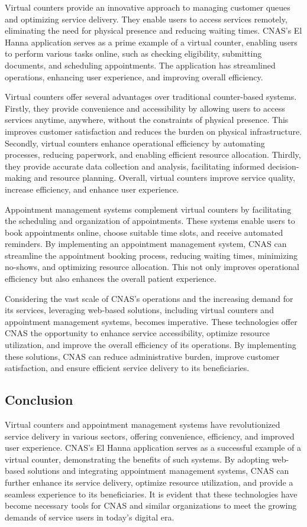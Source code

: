 Virtual counters provide an innovative approach to managing customer queues and optimizing service delivery. They enable users to access services remotely, eliminating the need for physical presence and reducing waiting times. CNAS's El Hanna application serves as a prime example of a virtual counter, enabling users to perform various tasks online, such as checking eligibility, submitting documents, and scheduling appointments. The application has streamlined operations, enhancing user experience, and improving overall efficiency.

Virtual counters offer several advantages over traditional counter-based systems. Firstly, they provide convenience and accessibility by allowing users to access services anytime, anywhere, without the constraints of physical presence. This improves customer satisfaction and reduces the burden on physical infrastructure. Secondly, virtual counters enhance operational efficiency by automating processes, reducing paperwork, and enabling efficient resource allocation. Thirdly, they provide accurate data collection and analysis, facilitating informed decision-making and resource planning. Overall, virtual counters improve service quality, increase efficiency, and enhance user experience.

Appointment management systems complement virtual counters by facilitating the scheduling and organization of appointments. These systems enable users to book appointments online, choose suitable time slots, and receive automated reminders. By implementing an appointment management system, CNAS can streamline the appointment booking process, reducing waiting times, minimizing no-shows, and optimizing resource allocation. This not only improves operational efficiency but also enhances the overall patient experience.


Considering the vast scale of CNAS's operations and the increasing demand for its services, leveraging web-based solutions, including virtual counters and appointment management systems, becomes imperative. These technologies offer CNAS the opportunity to enhance service accessibility, optimize resource utilization, and improve the overall efficiency of its operations. By implementing these solutions, CNAS can reduce administrative burden, improve customer satisfaction, and ensure efficient service delivery to its beneficiaries.

\subsection{Conclusion}
Virtual counters and appointment management systems have revolutionized service delivery in various sectors, offering convenience, efficiency, and improved user experience. CNAS's El Hanna application serves as a successful example of a virtual counter, demonstrating the benefits of such systems. By adopting web-based solutions and integrating appointment management systems, CNAS can further enhance its service delivery, optimize resource utilization, and provide a seamless experience to its beneficiaries. It is evident that these technologies have become necessary tools for CNAS and similar organizations to meet the growing demands of service users in today's digital era.

